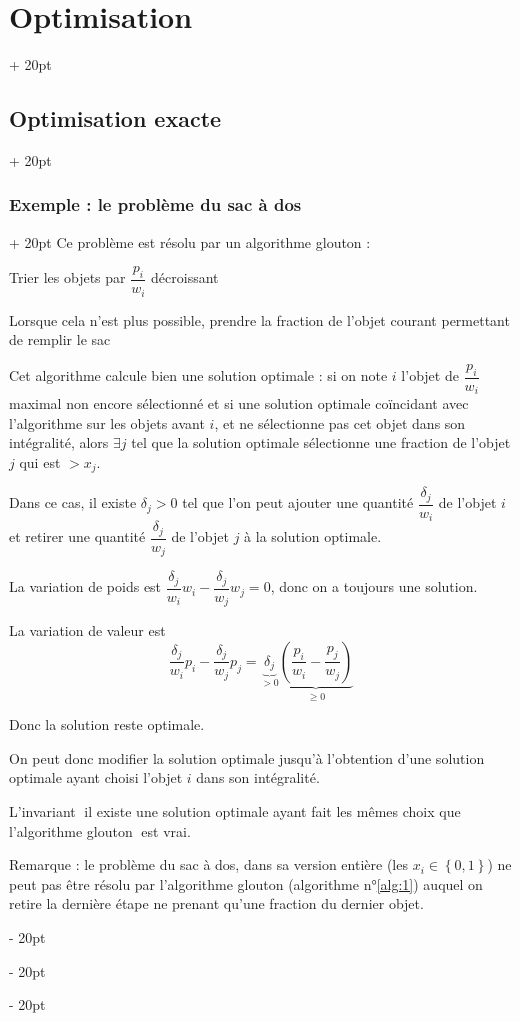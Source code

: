 \documentclass[a4paper, 12pt, twoside]{article}
\newenvironment{indalgo}[2][H]{
    \begin{algoBox}
        \begin{algorithm}[#1]
            \caption{#2}
}
{
        \end{algorithm}
    \end{algoBox}
}
\newcommand{\lr}[1]{\left( #1 \right)}
\newcommand{\set}[1]{\left\{ #1 \right\}}
\renewcommand{\ge}{\geqslant}
\newcommand{\simplecit}[1]{\guillemotleft$\;$#1$\;$\guillemotright}
\newcommand{\ind}[1][20pt]{\advance\leftskip + #1}
\newcommand{\deind}[1][20pt]{\advance\leftskip - #1}
\newenvironment{indt}[2][20pt]{#2 \par \ind[#1]}{\par \deind} %
\newcommand{\1}{\mathbbm 1}
\begin{document}
\begin{indt}{\section{Optimisation}}
\begin{indt}{\subsection{Optimisation exacte}}
\begin{indt}{\subsubsection{Exemple : le problème du sac à dos}}
                Ce problème est résolu par un algorithme glouton :

                \begin{indalgo}{Solution du problème du sac à dos, version en variables réelles}
                    \label{alg:1}
                    Trier les objets par $\dfrac{p_i}{w_i}$ décroissant\;


                    Lorsque cela n'est plus possible, prendre la fraction de l'objet courant permettant de remplir le sac\;
                \end{indalgo}

                Cet algorithme calcule bien une solution optimale : si on note $i$ l'objet de $\dfrac{p_i}{w_i}$ maximal non encore sélectionné et si une solution optimale coïncidant avec l'algorithme sur les objets avant $i$, et ne sélectionne pas cet objet dans son intégralité, alors $\exists j$ tel que la solution optimale sélectionne une fraction de l'objet $j$ qui est $> x_j$.

                Dans ce cas, il existe $\delta_j > 0$ tel que l'on peut ajouter une quantité $\dfrac{\delta_j}{w_i}$ de l'objet $i$ et retirer une quantité $\dfrac{\delta_j}{w_j}$ de l'objet $j$ à la solution optimale.

                La variation de poids est $\dfrac{\delta_j}{w_i}w_i - \dfrac{\delta_j}{w_j}w_j = 0$, donc on a toujours une solution.

                La variation de valeur est
                \[
                    \dfrac{\delta_j}{w_i} p_i - \dfrac{\delta_j}{w_j} p_j
                    = \underbrace{\delta_j}_{> 0}\underbrace{\lr{\dfrac{p_i}{w_i} - \dfrac{p_j}{w_j}}}_{\ge 0}
                \]

                Donc la solution reste optimale.

                On peut donc modifier la solution optimale jusqu'à l'obtention d'une solution optimale ayant choisi l'objet $i$ dans son intégralité.

                L'invariant \simplecit{il existe une solution optimale ayant fait les mêmes choix que l'algorithme glouton} est vrai.

                \vspace{12pt}
                
                Remarque : le problème du sac à dos, dans sa version entière (les $x_i \in \set{0, 1}$) ne peut pas être résolu par l'algorithme glouton (algorithme n°\ref{alg:1}) auquel on retire la dernière étape ne prenant qu'une fraction du dernier objet.


\end{indt}
\end{indt}
\end{indt}
\end{document}
